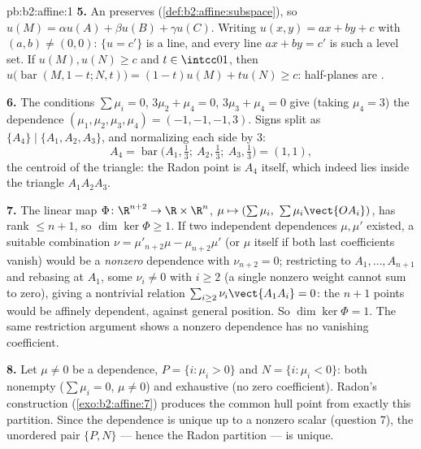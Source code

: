 \begin{solution}{pb:b2:affine:1}
\textbf{5.} An  preserves 
(\cref{def:b2:affine:subspace}), so $u(M) = \alpha u(A) +
\beta u(B) + \gamma u(C)$. Writing $u(x, y) = ax + by + c$
with $(a, b) \neq (0,0)$: $\{u = c'\}$ is a line, and every
line $ax + by = c'$ is such a level set. If $u(M), u(N) \geq
c$ and $t \in \intcc01$, then $u\bigl(\operatorname{bar}(M,
1-t; N, t)\bigr) = (1-t)u(M) + tu(N) \geq c$: half-planes are
.

\textbf{6.} The conditions $\sum\mu_i = 0$, $3\mu_2 + \mu_4 =
0$, $3\mu_3 + \mu_4 = 0$ give (taking $\mu_4 = 3$) the
dependence $(\mu_1, \mu_2, \mu_3, \mu_4) = (-1, -1, -1, 3)$.
Signs split as $\{A_4\} \mid \{A_1, A_2, A_3\}$, and
normalizing each side by $3$:
\[
A_4 = \operatorname{bar}\bigl(A_1, \tfrac13;\ A_2, \tfrac13;\
A_3, \tfrac13\bigr) = (1,1),
\]
the centroid of the triangle: the Radon point is $A_4$
itself, which indeed lies inside the triangle $A_1A_2A_3$.

\textbf{7.} The linear map $\Phi \colon \R^{n+2} \to \R
\times \R^n$, $\mu \mapsto (\sum\mu_i,\
\sum\mu_i\vect{OA_i})$, has rank $\leq n + 1$, so $\dim\ker
\Phi \geq 1$. If two independent dependences $\mu, \mu'$
existed, a suitable combination $\nu = \mu'_{n+2}\mu -
\mu_{n+2}\mu'$ (or $\mu$ itself if both last coefficients
vanish) would be a \emph{nonzero} dependence with $\nu_{n+2}
= 0$; restricting to $A_1, \dots, A_{n+1}$ and rebasing at
$A_1$, some $\nu_i \neq 0$ with $i \geq 2$ (a single nonzero
weight cannot sum to zero), giving a nontrivial relation
$\sum_{i\geq2}\nu_i\vect{A_1A_i} = 0$: the $n+1$ points would
be affinely dependent, against general position. So $\dim\ker
\Phi = 1$. The same restriction argument shows a nonzero
dependence has no vanishing coefficient.

\textbf{8.} Let $\mu \neq 0$ be a dependence, $P = \{i :
\mu_i > 0\}$ and $N = \{i : \mu_i < 0\}$: both nonempty
($\sum\mu_i = 0$, $\mu \neq 0$) and exhaustive (no zero
coefficient). Radon's construction (\cref{exo:b2:affine:7})
produces the common hull point from exactly this partition.
Since the dependence is unique up to a nonzero scalar
(question 7), the unordered pair $\{P, N\}$ --- hence the
Radon partition --- is unique.


\end{solution}
